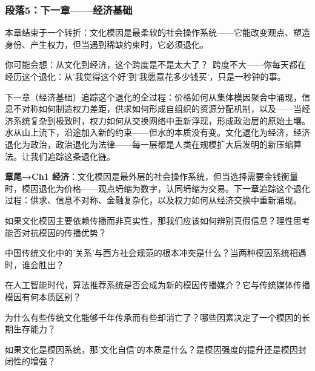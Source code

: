 \documentclass[../main.tex]{subfiles}
\begin{document}
	\subsubsection*{段落5：下一章——经济基础}

	本章结束于一个转折：文化模因是最柔软的社会操作系统——它能改变观点、塑造身份、产生权力，但当遇到稀缺约束时，它必须退化。

	\begin{tcolorbox}[colback=yellow!5, title=\textit{读者行为预测}]

		你可能会想：从文化到经济，这个跨度是不是太大了？\ 跨度不大——你每天都在经历这个退化：从'我觉得这个好'到'我愿意花多少钱买'，只是一秒钟的事。

	\end{tcolorbox}

下一章（经济基础）追踪这个退化的全过程：价格如何从集体模因聚合中涌现，信息不对称如何制造权力差距，供求如何形成自组织的资源分配机制，以及——当经济系统复杂到极致时，权力如何从交换网络中重新浮现，形成政治层的原始土壤。水从山上流下，沿途加入新的约束——但水的本质没有变。文化退化为经济，经济退化为政治，政治退化为法律——每一层都是人类在规模扩大后发明的新压缩算法。让我们追踪这条退化链。

	\textbf{章尾→Ch1 经济}：文化模因是最外层的社会操作系统，但当选择需要金钱衡量时，模因退化为价格——观点坍缩为数字，认同坍缩为交易。下一章追踪这个退化过程：供求、信息不对称、金融复杂化，以及权力如何从经济交换中重新涌现。

	\begin{reader_anticipation}

		\item 如果文化模因主要依赖传播而非真实性，那我们应该如何辨别真假信息？理性思考能否对抗模因的传播优势？

		\item 中国传统文化中的'关系'与西方社会规范的根本冲突是什么？当两种模因系统相遇时，谁会胜出？

		\item 在人工智能时代，算法推荐系统是否会成为新的模因传播媒介？它与传统媒体传播模因有何本质区别？

		\item 为什么有些传统文化能够千年传承而有些却消亡了？哪些因素决定了一个模因的长期生存能力？

		\item 如果文化是模因系统，那'文化自信'的本质是什么？是模因强度的提升还是模因封闭性的增强？

	\end{reader_anticipation}
\end{document}
